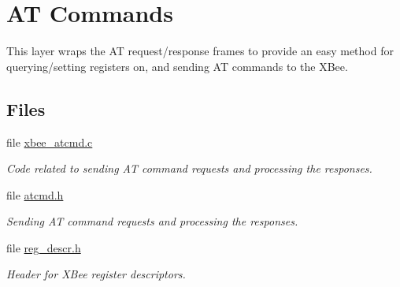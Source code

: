 \hypertarget{group__xbee__atcmd}{\section{A\-T Commands}
\label{group__xbee__atcmd}
}


This layer wraps the A\-T request/response frames to provide an easy method for querying/setting registers on, and sending A\-T commands to the X\-Bee.  


\subsection*{Files}
\begin{DoxyCompactItemize}
\item 
file \hyperlink{xbee__atcmd_8c}{xbee\-\_\-atcmd.\-c}
\begin{DoxyCompactList}\small\item\em Code related to sending A\-T command requests and processing the responses. \end{DoxyCompactList}\item 
file \hyperlink{atcmd_8h}{atcmd.\-h}
\begin{DoxyCompactList}\small\item\em Sending A\-T command requests and processing the responses. \end{DoxyCompactList}\item 
file \hyperlink{reg__descr_8h}{reg\-\_\-descr.\-h}
\begin{DoxyCompactList}\small\item\em Header for X\-Bee register descriptors. \end{DoxyCompactList}\end{DoxyCompactItemize}
